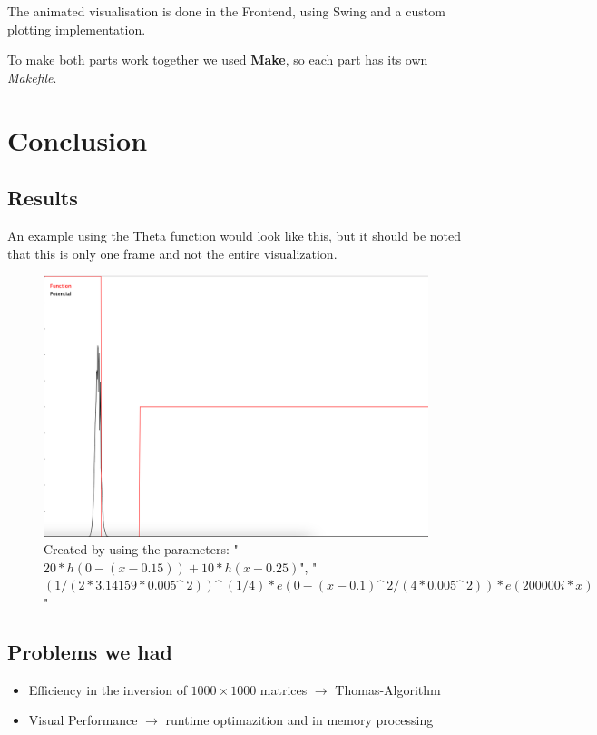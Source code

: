\documentclass[11pt]{article}
\theoremstyle{definition}
\begin{document}
The animated visualisation is done in the Frontend, using Swing and a custom plotting implementation.

To make both parts work together we used \textbf{Make}, so each part has its own \textit{Makefile}.

\section{Conclusion}
\subsection{Results}
An example using the Theta function would look like this, but it should be noted that this is only one frame and not the entire visualization.\\
\begin{figure}[H]
    \centering
    \includegraphics[width = \textwidth]{images/Screenshot 2021-03-14 at 12.50.44.png}
    \caption{Created by using the parameters: "$20*h(0-(x-0.15))+10*h(x-0.25)$", "$(1/(2*3.14159*0.005\^\ 2))\^\ (1/4)*e(0-(x-0.1)\^\ 2/(4*0.005\^\ 2))*e(200000i*x)$"}
    \label{fig:my_label}
\end{figure}
\subsection{Problems we had}
\begin{itemize}
    \item Efficiency in the inversion of $1000\times1000$ matrices $\to$ Thomas-Algorithm
    \item Visual Performance $\rightarrow$ runtime optimazition and in memory processing
\end{itemize}
\end{document}
